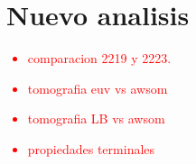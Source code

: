 \chapter{Nuevo analisis}
\textcolor{red}{
\begin{itemize}
  \item comparacion 2219 y 2223.
  \item tomografia euv vs awsom
  \item tomografia LB vs awsom
  \item propiedades terminales
\end{itemize}
}
